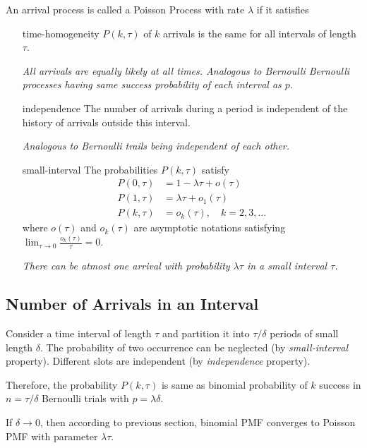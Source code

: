 \begin{definition}
    An arrival process is called a Poisson Process with rate $\lambda$ if it satisfies
    \begin{enumerate}
        \item [time-homogeneity] $P(k,\tau)$ of $k$ arrivals is the same for all intervals of length $\tau$.
        
        \textit{All arrivals are equally likely at all times. Analogous to Bernoulli Bernoulli processes having same success probability of each interval as $p$.}

        \item [independence] The number of arrivals during a period is independent of the history of arrivals outside this interval.

        \textit{Analogous to Bernoulli trails being independent of each other.}

        \item [small-interval] The probabilities $P(k,\tau)$ satisfy
        \begin{align*}
            P(0,\tau) &= 1-\lambda\tau+o(\tau)\\
            P(1,\tau) &= \lambda\tau+o_1(\tau)\\
            P(k,\tau) &= o_k(\tau), \quad k=2,3,\ldots
        \end{align*}
        where $o(\tau)$ and $o_k(\tau)$ are asymptotic notations satisfying $\lim_{\tau \to 0}\frac{o_k(\tau)}{\tau}=0$.

        \textit{There can be atmost one arrival with probability $\lambda\tau$ in a small interval $\tau$.}
    \end{enumerate}
\end{definition}

\subsection{Number of Arrivals in an Interval}
Consider a time interval of length $\tau$ and partition it into $\tau/\delta$ periods of small length $\delta$. The probability of two occurrence can be neglected (by \textit{small-interval} property). Different slots are independent (by \textit{independence} property).

Therefore, the probability $P(k, \tau)$ is same as binomial probability of $k$ success in $n=\tau/\delta$ Bernoulli trials with $p=\lambda\delta$.

If $\delta \to 0$, then according to previous section, binomial PMF converges to Poisson PMF with parameter $\lambda\tau$.

